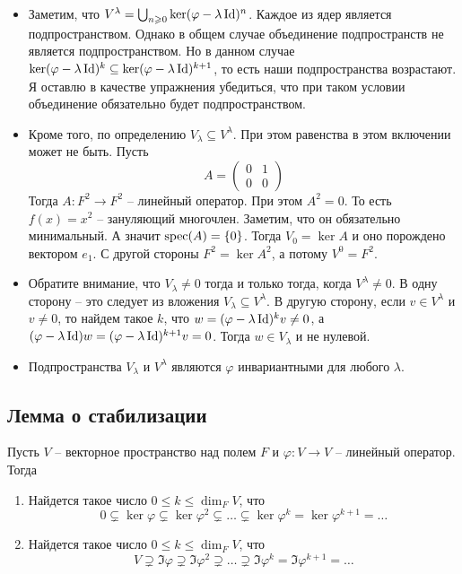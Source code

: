 \begin{itemize}
\item Заметим, что  $V^\lambda=\bigcup_{n\geqslant 0}\ker (\varphi - \lambda \operatorname{Id})^n$. Каждое из ядер является подпространством. Однако в общем случае объединение подпространств не является подпространством. Но в данном случае $\ker(\varphi - \lambda \operatorname{Id})^k\subseteq \ker(\varphi-\lambda \operatorname{Id})^{k+1}$, то есть наши подпространства возрастают. Я оставлю в качестве упражнения убедиться, что при таком условии объединение обязательно будет подпространством. 
 
\item Кроме того, по определению $V_\lambda \subseteq V^\lambda$. При этом равенства в этом включении может не быть. Пусть 
\[
A = 
\begin{pmatrix}
{0}&{1}\\
{0}&{0}
\end{pmatrix}
\]
Тогда $A\colon F^2\to F^2$ -- линейный оператор. При этом $A^2 = 0$. То есть $f(x) = x^2$ -- зануляющий многочлен. Заметим, что он обязательно минимальный. А значит $\operatorname{spec}(A) = \{0\}$. Тогда $V_0 = \ker A$ и оно порождено вектором $e_1$. С другой стороны $F^2 = \ker A^2$, а потому $V^0 = F^2$.

\item Обратите внимание, что $V_\lambda \neq 0$ тогда и только тогда, когда $V^\lambda\neq 0$. В одну сторону -- это следует из вложения $V_\lambda\subseteq V^\lambda$. В другую сторону, если $v\in V^\lambda$ и $v\neq 0$, то найдем такое $k$, что $w =(\varphi - \lambda\operatorname{Id})^k v \neq 0 $, а $(\varphi - \lambda \operatorname{Id})w = (\varphi - \lambda\operatorname{Id})^{k+1}v =0$. Тогда $w\in V_\lambda$ и не нулевой.

\item Подпространства $V_\lambda$ и $V^\lambda$ являются $\varphi$ инвариантными для любого $\lambda$. 
\end{itemize}


\subsection{Лемма о стабилизации}

\begin{claim}\label{claim::StabilityLemma}
Пусть $V$ -- векторное пространство над полем $F$ и $\varphi \colon V\to V$ -- линейный оператор. Тогда
\begin{enumerate}
\item Найдется такое число $0\leqslant k\leqslant \dim_F V$, что
\[
0\subsetneq \ker \varphi \subsetneq \ker \varphi^2\subsetneq \ldots \subsetneq \ker\varphi^k = \ker \varphi^{k+1} = \ldots
\]
\item
Найдется такое число $0\leqslant k\leqslant \dim_F V$, что
\[
 V \supsetneq \Im \varphi \supsetneq \Im \varphi^2 \supsetneq \ldots \supsetneq \Im\varphi^k = \Im \varphi^{k+1} = \ldots
\]
\end{enumerate}
\end{claim}

